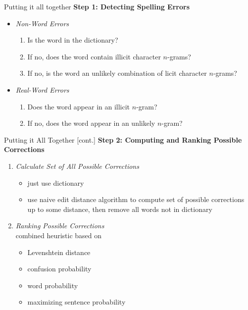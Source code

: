 \documentclass[professionalfonts, xcolor={usenames,svgnames,x11names,table}]{beamer}
\begin{document}
\begin{frame}{Putting it all together}
    \textbf{Step 1: Detecting Spelling Errors}\\
            \begin{itemize}
                \item \emph{Non-Word Errors}\\
                    \begin{enumerate}
                        \item Is the word in the dictionary?
                        \item If no, does the word contain illicit character $n$-grams?
                        \item If no, is the word an unlikely combination of licit character $n$-grams?
                    \end{enumerate}
                \item \emph{Real-Word Errors}\\
                    \begin{enumerate}
                        \item Does the word appear in an illicit $n$-gram?
                        \item If no, does the word appear in an unlikely $n$-gram?
                    \end{enumerate}
            \end{itemize}
\end{frame}

\begin{frame}{Putting it All Together [cont.]}
    \textbf{Step 2: Computing and Ranking Possible Corrections}\\
        \begin{enumerate}
            \item \emph{Calculate Set of All Possible Corrections}
                \begin{itemize}
                    \item just use dictionary
                    \item use naive edit distance algorithm to compute set of possible corrections up to some distance, then remove all words not in dictionary
                \end{itemize}
            \item \emph{Ranking Possible Corrections}\\
                combined heuristic based on
                \begin{itemize}
                    \item Levenshtein distance
                    \item confusion probability
                    \item word probability
                    \item maximizing sentence probability
                \end{itemize}
        \end{enumerate}
\end{frame}
\end{document}
